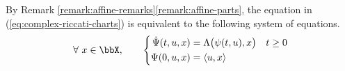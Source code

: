 \begin{remark}
  \label{remark:riccati-affine-formulation}
  By Remark \ref{remark:affine-remarks}\ref{remark:affine-parts}, the equation in (\ref{eq:complex-riccati-charts}) is equivalent to the following system of equations.
  \begin{equation}
    \label{eq:complex-riccati-system}
    \forall ~ \stateVar \in \stateSpace, \qquad \left\{\begin{aligned}
      \dot\aff(t, \momentVar, \stateVar) &= \ode\big(\affPart(t,\momentVar), \stateVar\big) & t \geq 0 \\
      \aff(0,\momentVar, \stateVar) &= \prj{\momentVar}{\stateVar}
    \end{aligned}\right.
  \end{equation}
\end{remark}
